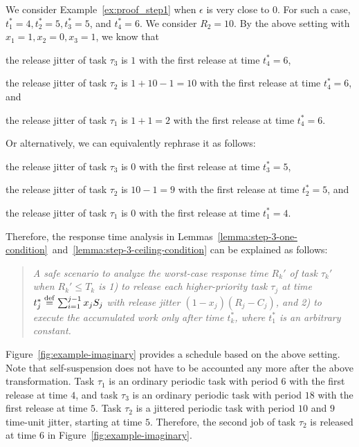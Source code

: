   We consider Example~\ref{ex:proof_step1} when $\epsilon$ is very
  close to $0$. For such a case, $t_1^*=4,
  t_2^*=5, t_3^*=5$, and $t_4^*=6$. We consider $R_2=10$. By the above
  setting with $x_1=1, x_2=0, x_3=1$, we know that
  \begin{compactitem}
  \item the release jitter of task $\tau_3$ is $1$ with the first
    release at time $t_4^*=6$,
  \item the release jitter of task $\tau_2$ is $1+10-1=10$ with the first
    release at time $t_4^*=6$, and
  \item the release jitter of task $\tau_1$ is $1+1=2$ with the first
    release at time $t_4^*=6$.
  \end{compactitem}
  Or alternatively, we can equivalently rephrase it as follows:
  \begin{compactitem}
  \item the release jitter of task $\tau_3$ is $0$ with the first
    release at time $t_3^*=5$,
  \item the release jitter of task $\tau_2$ is $10-1=9$ with the first
    release at time $t_2^*=5$, and
  \item the release jitter of task $\tau_1$ is $0$ with the first
    release at time $t_1^*=4$.
  \end{compactitem}


  Therefore, the response time analysis in
  Lemmas~\ref{lemma:step-3-one-condition}~and~\ref{lemma:step-3-ceiling-condition}
  can be explained as follows:

  \begin{quote}\emph{A safe scenario to analyze the worst-case
      response time $R_k'$ of task $\tau_k'$ when $R_k' \leq T_k$ is
      1) to release each higher-priority task $\tau_j$ at time
      $t_j^*\stackrel{\mathrm{def}}{=} \sum_{i=1}^{j-1} x_j S_j$ with release jitter
      $(1-x_j)(R_j-C_j)$, and 2) to execute the accumulated work only
      after time $t_k^*$, where $t_1^*$ is an arbitrary constant.}
  \end{quote}

  Figure~\ref{fig:example-imaginary} provides a schedule based on the
  above setting. Note that self-suspension does not have to be
  accounted any more after the above transformation.  Task $\tau_1$ is
  an ordinary periodic task with period $6$ with the first release at
  time $4$, and task $\tau_3$ is an ordinary periodic task with period
  $18$ with the first release at time $5$. Task $\tau_2$ is a jittered
  periodic task with period $10$ and $9$ time-unit jitter, starting at
  time $5$. Therefore, the second job of task $\tau_2$ is released at
  time $6$ in Figure~\ref{fig:example-imaginary}.

